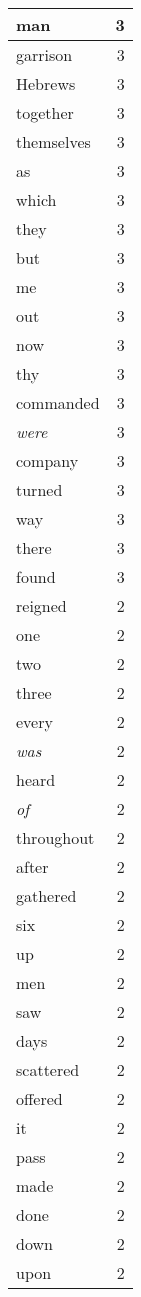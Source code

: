 \begin{center}
\begin{longtable}{l|r}
man & 3 \\ \hline
garrison & 3 \\ \hline
Hebrews & 3 \\ \hline
together & 3 \\ \hline
themselves & 3 \\ \hline
as & 3 \\ \hline
which & 3 \\ \hline
they & 3 \\ \hline
but & 3 \\ \hline
me & 3 \\ \hline
out & 3 \\ \hline
now & 3 \\ \hline
thy & 3 \\ \hline
commanded & 3 \\ \hline
\emph{were} & 3 \\ \hline
company & 3 \\ \hline
turned & 3 \\ \hline
way & 3 \\ \hline
there & 3 \\ \hline
found & 3 \\ \hline
reigned & 2 \\ \hline
one & 2 \\ \hline
two & 2 \\ \hline
three & 2 \\ \hline
every & 2 \\ \hline
\emph{was} & 2 \\ \hline
heard & 2 \\ \hline
\emph{of} & 2 \\ \hline
throughout & 2 \\ \hline
after & 2 \\ \hline
gathered & 2 \\ \hline
six & 2 \\ \hline
up & 2 \\ \hline
men & 2 \\ \hline
saw & 2 \\ \hline
days & 2 \\ \hline
scattered & 2 \\ \hline
offered & 2 \\ \hline
it & 2 \\ \hline
pass & 2 \\ \hline
made & 2 \\ \hline
done & 2 \\ \hline
down & 2 \\ \hline
upon & 2 \\ \hline

\end{longtable}
\end{center}
